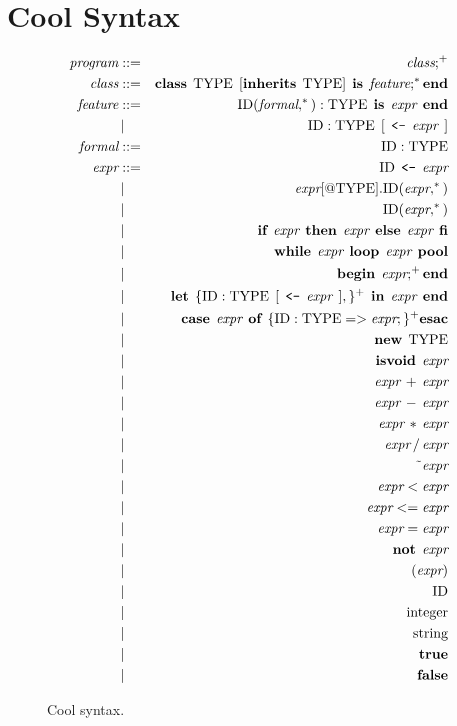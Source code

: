 \section{Cool Syntax}
\label{sec-gram}


\begin{figure}
\begin{eqnarray*}
\mbox{\it program} & ::= & \mbox{\it class};^{+} \\
\mbox{\it class} & ::= & \mbox{\bf class} \;\, \mbox{TYPE} \;\, [ \mbox{\bf inherits} \;\, \mbox{TYPE} ] \;\, \mbox{\bf is} \;\, \mbox{\it feature};^{\ast} \mbox{\bf end} \\
\mbox{\it feature} & ::= & \mbox{ID}( \mbox{\it formal},^{\ast} ) : \mbox{TYPE} \;\, \mbox{\bf is}
   \;\, \mbox{\it expr} \;\, \mbox{\bf end} \\
& \,|\, & \mbox{ID} : \mbox{TYPE} \;\, [ \;\,\mbox{\tt <-}\;\, \mbox{\it expr} \;\, ] \\
\mbox{\it formal} & ::= & \mbox{ID} : \mbox{TYPE} \\
\mbox{\it expr} & ::= & \mbox{ID} \;\,\mbox{\tt <-}\;\, \mbox{\it expr} \\
 & \,|\, & \mbox{\it expr}[@\mbox{TYPE}].\mbox{ID}(\mbox{\it expr},^{\ast}) \\
 & \,|\, & \mbox{ID}(\mbox{\it expr},^{\ast}) \\
& \,|\, & \mbox{\bf if} \;\, \mbox{\it expr} \;\, \mbox{\bf then} \;\, \mbox{\it expr} \;\, \mbox{\bf else} \;\, \mbox{\it expr} \;\, \mbox{\bf fi}  \\
& \,|\, & \mbox{\bf while} \;\, \mbox{\it expr} \;\, \mbox{\bf loop} \;\, \mbox{\it expr} \;\, \mbox{\bf pool} \\
& \,|\, & \mbox{\bf begin} \;\, \mbox{\it expr};^+ \mbox{\bf end} \\
& \,|\, & \mbox{\bf let} \;\, \{ \mbox{ID} : \mbox{TYPE} \;\, [ \;\,\mbox{\tt <-}\;\, \mbox{\it expr} \;\, ],\}^+ \;\, \mbox{\bf in} \;\,
	\mbox{\it expr} \;\,  \mbox{\bf end} \\
& \,|\, & \mbox{\bf case} \;\, \mbox{\it expr} \;\, \mbox{\bf of} \;\, 
		\{ \mbox{ID} : \mbox{TYPE} => \mbox{\it expr}; \}^+
	 \mbox{\bf esac} \\
& \,|\, & \mbox{\bf new} \;\, \mbox{TYPE} \\
& \,|\, & \mbox{\bf isvoid} \;\, \mbox{\it expr} \\
& \,|\, & \mbox{\it expr} \,+\, \mbox{\it expr} \\
& \,|\, & \mbox{\it expr} \,-\, \mbox{\it expr} \\
& \,|\, & \mbox{\it expr} \,\ast\, \mbox{\it expr} \\
& \,|\, & \mbox{\it expr} \,/\, \mbox{\it expr} \\
& \,|\, & \mbox{\~{ }}\mbox{\it expr} \\
& \,|\, & \mbox{\it expr} < \mbox{\it expr} \\
& \,|\, & \mbox{\it expr} <= \mbox{\it expr} \\
& \,|\, & \mbox{\it expr} = \mbox{\it expr} \\
& \,|\, & \mbox{\bf not} \;\, \mbox{\it expr} \\
& \,|\, & (\mbox{\it expr}) \\
& \,|\, & \mbox{ID} \\
& \,|\, & \mbox{integer} \\
& \,|\, & \mbox{string} \\
& \,|\, & \mbox{\bf true} \\
& \,|\, & \mbox{\bf false}
\end{eqnarray*}
\caption{Cool syntax.}
\label{fig1}
\end{figure}

